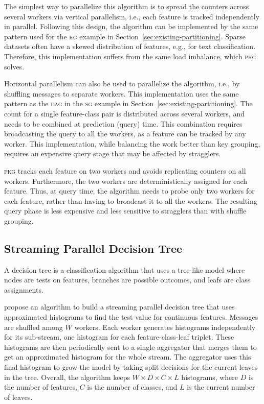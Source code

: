 \documentclass[10pt,conference,letterpaper]{IEEEtran}
\newcommand{\dagr}{\textsc{dag}\xspace}
\newcommand{\pkgs}{\textsc{pkg}\xspace}
\newcommand{\kg}{\textsc{kg}\xspace}
\newcommand{\sg}{\textsc{sg}\xspace}
\begin{document}
The simplest way to parallelize this algorithm is to spread the counters across several workers via vertical parallelism, i.e., each feature is tracked independently in parallel.
Following this design, the algorithm can be implemented by the same pattern used for the \kg example in Section~\ref{sec:existing-partitioning}. Sparse datasets often have a skewed distribution of features, e.g., for text classification.
Therefore, this implementation suffers from the same load imbalance, which \pkgs solves.

Horizontal parallelism can also be used to parallelize the algorithm, i.e., by shuffling messages to separate workers.
This implementation uses the same pattern as the \dagr in the \sg example in Section~\ref{sec:existing-partitioning}. The count for a single feature-class pair is distributed across several workers, and needs to be combined at prediction (query) time. This combination requires broadcasting the query to all the workers, as a feature can be tracked by any worker.
This implementation, while balancing the work better than key grouping, requires an expensive query stage that may be affected by stragglers.

\pkgs tracks each feature on two workers and avoids replicating counters on all workers.
Furthermore, the two workers are deterministically assigned for each feature.
Thus, at query time, the algorithm needs to probe only two workers for each feature, rather than having to broadcast it to all the workers.
The resulting query phase is less expensive and less sensitive to stragglers than with shuffle grouping.


\subsection{Streaming Parallel Decision Tree}



A decision tree is a classification algorithm that uses a tree-like model where nodes are tests on features, branches are possible outcomes, and leafs are class assignments.

\citet{ben-haim2010spdt} propose an algorithm to build a streaming parallel decision tree that uses approximated histograms to find the test value for continuous features.
Messages are shuffled among $W$ workers.
Each worker generates histograms independently for its sub-stream, one histogram for each feature-class-leaf triplet.
These histograms are then periodically sent to a single aggregator that merges them to get an approximated histogram for the whole stream.
The aggregator uses this final histogram to grow the model by taking split decisions for the current leaves in the tree.
Overall, the algorithm keeps $W \times D \times C \times L$ histograms, where $D$ is the number of features, $C$ is the number of classes, and $L$ is the current number of leaves.
\end{document}
